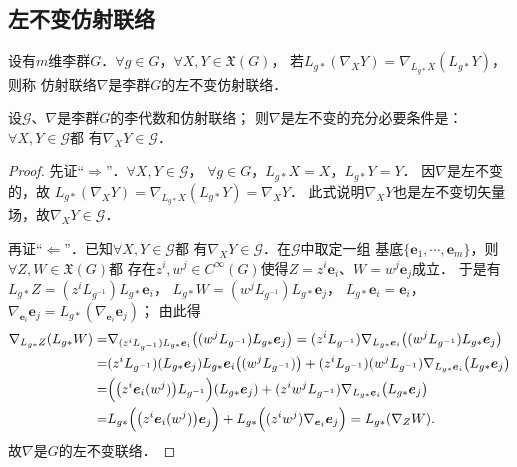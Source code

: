  

\subsection{左不变仿射联络}\label{chlg:sec_lic}

\begin{definition}\label{chlg:def_lic}
    设有$m$维李群$G$．$\forall g\in G$，$\forall X,Y\in \mathfrak{X}(G)$，
    若$L_{g*}(\nabla_X Y) = \nabla_{L_{g*}X}(L_{g*}Y)$，则称
    仿射联络$\nabla$是李群$G$的{\heiti 左不变仿射联络}．
\end{definition}

\begin{theorem}\label{chlg:thm_lic}
    设$\mathscr{G}$、$\nabla$是李群$G$的李代数和仿射联络；
    则$\nabla$是左不变的充分必要条件是：$\forall X,Y \in \mathscr{G}$都
    有$\nabla_X Y\in \mathscr{G}$．
\end{theorem}
\begin{proof}
    先证“$\Rightarrow$”．$\forall X,Y \in \mathscr{G}$，
    $\forall g\in G$，$L_{g*} X = X$，$L_{g*} Y = Y$．
    因$\nabla$是左不变的，故
    $    L_{g*}(\nabla_X Y) = \nabla_{L_{g*}X}(L_{g*}Y) = \nabla_{X}Y $．
    此式说明$\nabla_X Y$也是左不变切矢量场，故$\nabla_X Y\in \mathscr{G}$．
    
    再证“$\Leftarrow$”．已知$\forall X,Y \in \mathscr{G}$都
    有$\nabla_X Y\in \mathscr{G}$．在$\mathscr{G}$中取定一组
    基底$\{\boldsymbol{e}_1,\cdots,\boldsymbol{e}_m\}$，则$\forall Z,W\in \mathfrak{X}(G)$都
    存在$z^i,w^j\in C^\infty(G)$使得$Z=z^i \boldsymbol{e}_i$、$W=w^j \boldsymbol{e}_j$成立．    于是有
    $L_{g*}Z = (z^i L_{g^{-1}}) L_{g*} \boldsymbol{e}_i$，
    $L_{g*}W = (w^j L_{g^{-1}}) L_{g*} \boldsymbol{e}_j$，
    $L_{g*}\boldsymbol{e}_i = \boldsymbol{e}_i$，
    $\nabla_{\boldsymbol{e}_i} \boldsymbol{e}_j = L_{g*}(\nabla_{\boldsymbol{e}_i} \boldsymbol{e}_j)$；
    由此得
    \begin{align*}
        \nabla_{L_{g*}Z} (L_{g*}W)= & \nabla_{(z^i L_{g^{-1}}) L_{g*} \boldsymbol{e}_i }
        \bigl( (w^j L_{g^{-1}}) L_{g*} \boldsymbol{e}_j \bigr)
        =(z^i L_{g^{-1}}) \nabla_{ L_{g*} \boldsymbol{e}_i }\bigl( (w^j L_{g^{-1}}) L_{g*} \boldsymbol{e}_j \bigr) \\
        =&(z^i L_{g^{-1}}) (L_{g*} \boldsymbol{e}_j) L_{g*} \boldsymbol{e}_i \bigl( (w^j L_{g^{-1}})  \bigr)
        + (z^i L_{g^{-1}}) (w^j L_{g^{-1}})  \nabla_{ L_{g*} \boldsymbol{e}_i }\bigl( L_{g*} \boldsymbol{e}_j \bigr) \\
        =& \Bigl( \bigl(z^i \boldsymbol{e}_i(w^j) \bigr)L_{g^{-1}}\Bigr) (L_{g*} \boldsymbol{e}_j)
        + (z^i w^j L_{g^{-1}}) \nabla_{ L_{g*} \boldsymbol{e}_i }\bigl( L_{g*} \boldsymbol{e}_j \bigr)  \\
        =& L_{g*}\Bigl( \bigl(z^i \boldsymbol{e}_i(w^j) \bigr) \boldsymbol{e}_j \Bigr)
        +L_{g*}\Bigl( (z^i w^j ) \nabla_{\boldsymbol{e}_i} \boldsymbol{e}_j\Bigr)
        =L_{g*} (\nabla_Z W ) .
    \end{align*}  %
    故$\nabla$是$G$的左不变联络．
\end{proof}


